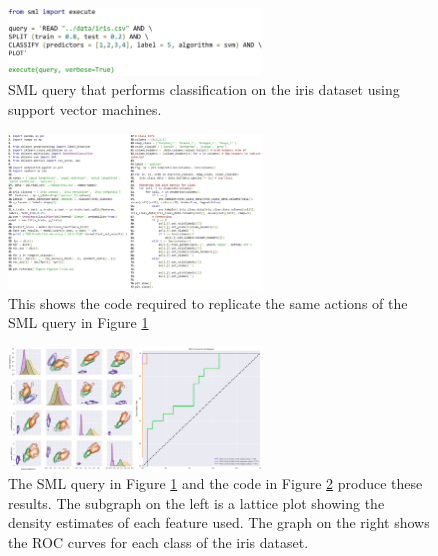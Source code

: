 \documentclass[jair,twoside,11pt,theapa]{article}
\begin{document}
\begin{figure}
\includegraphics[width=0.6\textwidth]{figs/iris_sml.png}
\centering
\caption{SML query that performs classification on the iris dataset using support vector machines.}
\label{fig:SML:IrisQuery}
\end{figure}

\begin{figure}
\includegraphics[width=0.6\textwidth]{figs/iris_manual.png}
\centering
\caption{This shows the code required to replicate the same actions of the SML query in Figure \ref{fig:SML:IrisQuery}}
\label{fig:Manual:IrisCode}
\end{figure}

\begin{figure}
\includegraphics[width=0.6\textwidth]{figs/iris_results.png}
\centering
\caption{The SML query in Figure \ref{fig:SML:IrisQuery} and the code in Figure \ref{fig:Manual:IrisCode} produce these results. The subgraph on the left is a lattice plot showing the density estimates of each feature used. The graph on the right shows the ROC curves for each class of the iris dataset.}
\label{fig:IrisResults}
\end{figure}
\end{document}
